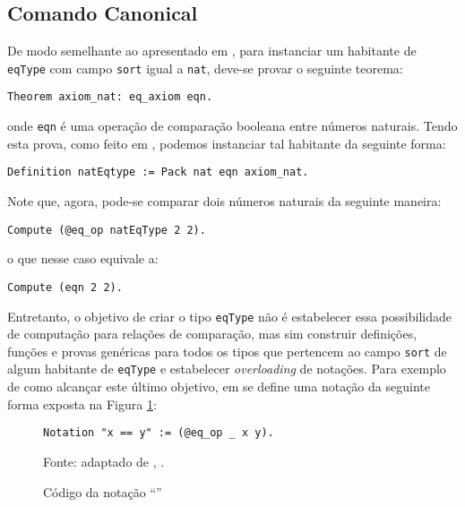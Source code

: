 \subsection{Comando Canonical} De modo semelhante ao apresentado em \cite{assia_mahboubi_2022_7118596}, para instanciar um habitante de \lstinline[language = coq]$eqType$ com campo \lstinline[language = coq]$sort$ igual a \lstinline[language = coq]$nat$, deve-se provar o seguinte teorema:
    \begin{lstlisting}[language=coq,frame=single,tabsize=1]
Theorem axiom_nat: eq_axiom eqn.
    \end{lstlisting}
onde \lstinline[language = coq]$eqn$ é uma operação de comparação booleana entre números naturais.
Tendo esta prova, como feito em \cite{assia_mahboubi_2022_7118596}, podemos instanciar tal habitante
da seguinte forma:
    \begin{lstlisting}[language=coq,frame=single,tabsize=1]
Definition natEqtype := Pack nat eqn axiom_nat.
    \end{lstlisting}
Note que, agora, pode-se comparar dois números naturais da seguinte maneira:
    \begin{lstlisting}[language=coq,frame=single,tabsize=1]
Compute (@eq_op natEqType 2 2).
    \end{lstlisting}
o que nesse caso equivale a:
    \begin{lstlisting}[language=coq,frame=single,tabsize=1]
Compute (eqn 2 2).
    \end{lstlisting}

Entretanto, o objetivo de criar o tipo \lstinline[language = coq]$eqType$ não é estabelecer essa possibilidade de computação para relações de comparação, mas sim construir definições, funções e provas genéricas para todos os tipos que pertencem ao campo \lstinline[language = coq]$sort$ de algum habitante de \lstinline[language = coq]$eqType$ e estabelecer \textit{overloading} de notações. Para exemplo de como alcançar este último objetivo, em \cite{assia_mahboubi_2022_7118596} se define uma notação da seguinte forma exposta na Figura \ref{fig:notation-eqop}:
\begin{figure}[ht]
    \centering
    \caption{Código da notação ``\coqinline[]{==}''}
\begin{lstlisting}[language=coq,frame=single,tabsize=1]
Notation "x == y" := (@eq_op _ x y).
\end{lstlisting}
    \footnotesize{Fonte: adaptado de \citeauthor{assia_mahboubi_2022_7118596}, \citeyear{assia_mahboubi_2022_7118596}.
    }
    \label{fig:notation-eqop}
\end{figure}
\\

